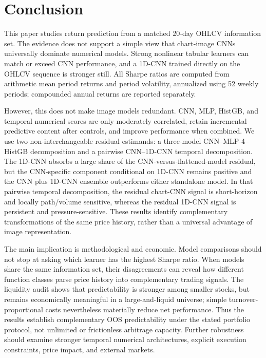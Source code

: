 \section{Conclusion}

This paper studies return prediction from a matched 20-day OHLCV information set. The evidence does not support a simple view that chart-image CNNs universally dominate numerical models. Strong nonlinear tabular learners can match or exceed CNN performance, and a 1D-CNN trained directly on the OHLCV sequence is stronger still. All Sharpe ratios are computed from arithmetic mean period returns and period volatility, annualized using 52 weekly periods; compounded annual returns are reported separately.

However, this does not make image models redundant. CNN, MLP, HistGB, and temporal numerical scores are only moderately correlated, retain incremental predictive content after controls, and improve performance when combined. We use two non-interchangeable residual estimands: a three-model CNN--MLP-4--HistGB decomposition and a pairwise CNN--1D-CNN temporal decomposition. The 1D-CNN absorbs a large share of the CNN-versus-flattened-model residual, but the CNN-specific component conditional on 1D-CNN remains positive and the CNN plus 1D-CNN ensemble outperforms either standalone model. In that pairwise temporal decomposition, the residual chart-CNN signal is short-horizon and locally path/volume sensitive, whereas the residual 1D-CNN signal is persistent and pressure-sensitive. These results identify complementary transformations of the same price history, rather than a universal advantage of image representation.

The main implication is methodological and economic. Model comparisons should not stop at asking which learner has the highest Sharpe ratio. When models share the same information set, their disagreements can reveal how different function classes parse price history into complementary trading signals. The liquidity audit shows that predictability is stronger among smaller stocks, but remains economically meaningful in a large-and-liquid universe; simple turnover-proportional costs nevertheless materially reduce net performance. Thus the results establish complementary OOS predictability under the stated portfolio protocol, not unlimited or frictionless arbitrage capacity. Further robustness should examine stronger temporal numerical architectures, explicit execution constraints, price impact, and external markets.
